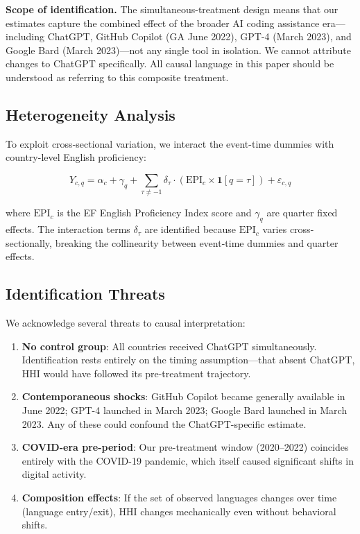 \documentclass[12pt]{article}
\begin{document}
\textbf{Scope of identification.} The simultaneous-treatment design means that our estimates capture the combined effect of the broader AI coding assistance era---including ChatGPT, GitHub Copilot (GA June 2022), GPT-4 (March 2023), and Google Bard (March 2023)---not any single tool in isolation. We cannot attribute changes to ChatGPT specifically. All causal language in this paper should be understood as referring to this composite treatment.

\subsection{Heterogeneity Analysis}

To exploit cross-sectional variation, we interact the event-time dummies with country-level English proficiency:

\begin{equation}
Y_{c,q} = \alpha_c + \gamma_q + \sum_{\tau \neq -1} \delta_\tau \cdot (\text{EPI}_c \times \mathbf{1}[q = \tau]) + \varepsilon_{c,q}
\label{eq:heterogeneity}
\end{equation}

\noindent where $\text{EPI}_c$ is the EF English Proficiency Index score and $\gamma_q$ are quarter fixed effects. The interaction terms $\delta_\tau$ are identified because $\text{EPI}_c$ varies cross-sectionally, breaking the collinearity between event-time dummies and quarter effects.

\subsection{Identification Threats}

We acknowledge several threats to causal interpretation:

\begin{enumerate}
    \item \textbf{No control group}: All countries received ChatGPT simultaneously. Identification rests entirely on the timing assumption---that absent ChatGPT, HHI would have followed its pre-treatment trajectory.
    \item \textbf{Contemporaneous shocks}: GitHub Copilot became generally available in June 2022; GPT-4 launched in March 2023; Google Bard launched in March 2023. Any of these could confound the ChatGPT-specific estimate.
    \item \textbf{COVID-era pre-period}: Our pre-treatment window (2020--2022) coincides entirely with the COVID-19 pandemic, which itself caused significant shifts in digital activity.
    \item \textbf{Composition effects}: If the set of observed languages changes over time (language entry/exit), HHI changes mechanically even without behavioral shifts.
\end{enumerate}
\end{document}
